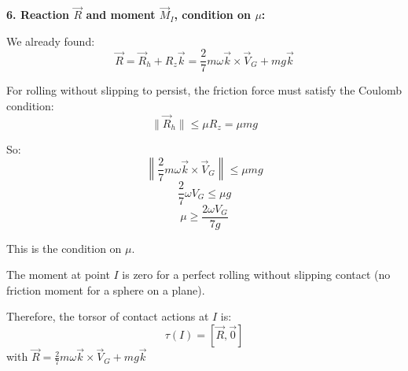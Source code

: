 \documentclass[12pt]{article}
\begin{document}
\begin{correctionbox}
\textbf{6. Reaction $\vec{R}$ and moment $\vec{M}_I$, condition on $\mu$:}

We already found:
$$\vec{R} = \vec{R}_h + R_z\vec{k} = \frac{2}{7}m\omega\vec{k} \times \vec{V}_G + mg\vec{k}$$

For rolling without slipping to persist, the friction force must satisfy the Coulomb condition:
$$\|\vec{R}_h\| \leq \mu R_z = \mu mg$$

So:
$$\left\|\frac{2}{7}m\omega\vec{k} \times \vec{V}_G\right\| \leq \mu mg$$
$$\frac{2}{7}\omega V_G \leq \mu g$$
$$\mu \geq \frac{2\omega V_G}{7g}$$

This is the condition on $\mu$.

The moment at point $I$ is zero for a perfect rolling without slipping contact (no friction moment for a sphere on a plane).

Therefore, the torsor of contact actions at $I$ is:
$$\tau(I) = [\vec{R}, \vec{0}]$$
with $\vec{R} = \frac{2}{7}m\omega\vec{k} \times \vec{V}_G + mg\vec{k}$
\end{correctionbox}
\end{document}
